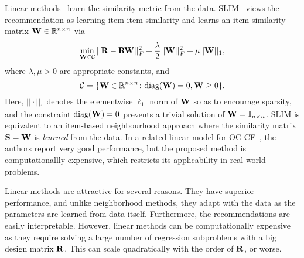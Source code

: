 Linear methods~\cite{Ning:2011, Sedhain:2016} learn the similarity metric from the data. SLIM~\citep{Ning:2011} views the recommendation as learning item-item similarity and learns an item-similarity matrix $\mathbf{W} \in \mathbb{R}^{n \times n}$ via
\begin{equation}
\label{eqn:slim}
\min_{ \mathbf{W} \in \mathcal{C} } || \mathbf{R} - \mathbf{R} \mathbf{W} ||_F^2 + \frac{\lambda}{2} || \mathbf{W} ||_F^2 + \mu || \mathbf{W} ||_1,
\end{equation}
where $\lambda, \mu > 0$ are appropriate constants, and
\begin{equation}
\label{eqn:slim-constraint}
\mathcal{C} = \{ \mathbf{W} \in \mathbb{R}^{n \times n} \colon \text{diag}( \mathbf{W} ) = 0, \mathbf{W} \geq 0 \}.
\end{equation}
Here, $|| \cdot ||_1$ denotes the elementwise $\ell_1$ norm of $\mathbf{W}$ so as to encourage sparsity, and the constraint $\text{diag}( \mathbf{W} ) = 0$ prevents a trivial solution of $\mathbf{W} = \mathbf{I}_{n \times n}$. SLIM is equivalent to an item-based neighbourhood approach where the similarity matrix $\mathbf{S} = \mathbf{W}$ is \emph{learned} from the data.
%
In a related linear model for OC-CF~\citep{Sedhain:2016}, the authors report very good performance, but the proposed method is computationallly expensive, which restricts its applicability in real world problems.


Linear methods are attractive for several reasons. They have superior performance, and unlike neighborhood methods, they adapt with the data as the parameters are learned from data itself. Furthermore, the recommendations are easily interpretable. However, linear methods can be computationally expensive as they require solving a large number of regression subproblems with a big design matrix $\mathbf{R}$. This can scale quadratically with the order of $\mathbf{R}$, or worse.

